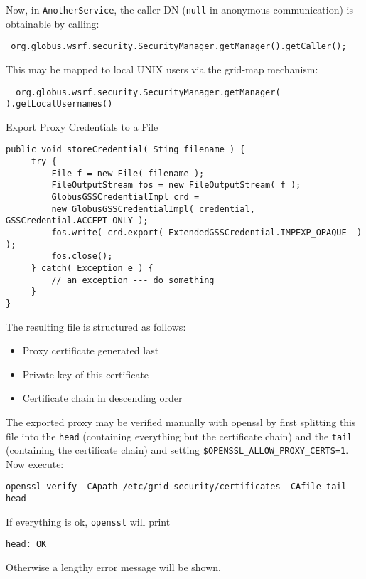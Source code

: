 \documentclass{article}
\begin{document}
Now, in \verb!AnotherService!, the caller DN (\verb!null! in
anonymous communication) is obtainable by calling:

\begin{verbatim}
 org.globus.wsrf.security.SecurityManager.getManager().getCaller();
\end{verbatim}

This may be mapped to local UNIX users via the grid-map mechanism:

\begin{verbatim}
  org.globus.wsrf.security.SecurityManager.getManager( ).getLocalUsernames()
\end{verbatim}

Export Proxy Credentials to a File


\begin{verbatim}
public void storeCredential( Sting filename ) {
     try {
         File f = new File( filename );
         FileOutputStream fos = new FileOutputStream( f );
         GlobusGSSCredentialImpl crd = 
         new GlobusGSSCredentialImpl( credential, GSSCredential.ACCEPT_ONLY );
         fos.write( crd.export( ExtendedGSSCredential.IMPEXP_OPAQUE  ) );
         fos.close();
     } catch( Exception e ) {
         // an exception --- do something
     }
}
\end{verbatim}

The resulting file is structured as follows:

\begin{itemize}
\item
  Proxy certificate generated last
\item
  Private key of this certificate
\item
  Certificate chain in descending order
\end{itemize}
The exported proxy may be verified manually with openssl by first
splitting this file into the \verb!head! (containing everything but
the certificate chain) and the \verb!tail! (containing the
certificate chain) and setting \verb!$OPENSSL_ALLOW_PROXY_CERTS=1!.
Now execute:

\begin{verbatim}
openssl verify -CApath /etc/grid-security/certificates -CAfile tail head
\end{verbatim}
If everything is ok, \verb!openssl! will print

\begin{verbatim}
head: OK
\end{verbatim}
Otherwise a lengthy error message will be shown.
\end{document}
